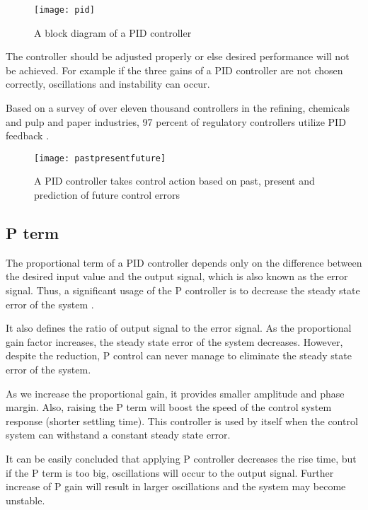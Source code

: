  \begin{figure}[ht]
    \centering
    \texttt{[image: pid]}
    \caption{A block diagram of a PID controller \cite{wikixxx}}
    \label{fig:pidblock}
\end{figure}

The controller should be adjusted properly or else desired performance will not be achieved. For example if the three gains of a PID controller are not chosen correctly, oscillations and instability can occur.

Based on a survey of over eleven thousand controllers in the refining, chemicals and pulp and paper industries, 97 percent of regulatory controllers utilize PID feedback \cite{desborough2000regulatory}.
 
 \begin{figure}[ht]
    \centering
    \texttt{[image: pastpresentfuture]}
    \caption{A PID controller takes control action based on past, present and
prediction of future control errors \cite{PidC8}}
    \label{fig:stable_unstable}
\end{figure}

\subsection{P term}

The proportional term of a PID controller depends only on the difference between the desired input value and the output signal, which is also known as the error signal. Thus, a significant usage of the P controller is to decrease the steady state error of the system \cite{pid}.

It also defines the ratio of output signal to the error signal. As the proportional gain factor  increases, the steady state error of the system decreases. However, despite the reduction, P control can never manage to eliminate the steady state error of the system. 

As we increase the proportional gain, it provides smaller amplitude and phase margin. Also, raising the P term will boost  the speed of the control system response (shorter settling time). This controller is used by itself when the control system can withstand a constant steady state error.

It can be easily concluded that applying P controller decreases the rise time, but if the P term is too big, oscillations will occur to the output signal. Further increase of P gain will result in larger oscillations and the system may become unstable.


